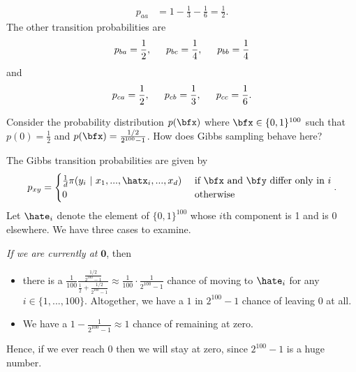 \begin{homework}[e]
\begin{prf}
\begin{align*}
      p_{aa} &= 1 - \frac{1}{3} - \frac{1}{6} = \frac{1}{2}.
    \end{align*}
    The other transition probabilities are
    \begin{align*}
      p_{ba} = \frac{1}{2}, \hspace{1.5em} p_{bc} = \frac{1}{4}, \hspace{1.5em} p_{bb} = \frac{1}{4}
    \end{align*}
    and
    \begin{align*}
      p_{ca} = \frac{1}{2}, \hspace{1.5em} p_{cb} = \frac{1}{3}, \hspace{1.5em} p_{cc} = \frac{1}{6}.
    \end{align*}
  \end{prf}
  \prob Consider the probability distribution $p(\bfx)$ where $\bfx \in \{0,1\}^{100}$ such that $p(0) = \frac{1}{2}$ and $p(\bfx) = \frac{1/2}{2^{100}-1}$. How does Gibbs sampling behave here?
  \begin{prf}
    The Gibbs transition probabilities are given by
    \begin{align*}
      p_{xy} =
      \begin{cases}
        \frac{1}{d}\pi(y_i ~|~ x_1,...,\hatx_i,...,x_d) & \text{ if $\bfx$ and $\bfy$ differ only in $i$} \\
        0 & \text{ otherwise }
      \end{cases}.
    \end{align*}
    Let $\hate_i$ denote the element of $\{0,1\}^{100}$ whose $i$th component is 1 and is 0 elsewhere.
    We have three cases to examine.

    \bigskip 

    \noindent\emph{If we are currently at }$\mathbf{0}$, then
    \begin{itemize}
    \item there is a $\frac{1}{100}\frac{\frac{1/2}{2^{100}-1}}{\frac{1}{2}+\frac{1/2}{2^{100}-1}} \approx \frac{1}{100}\cdot \frac{1}{2^{100}-1}$ chance of moving to $\hate_i$ for any $i \in \{1,...,100\}$. Altogether, we have a $1$ in $2^{100} - 1$ chance of leaving $0$ at all.
    \item We have a $1 - \frac{1}{2^{100}-1}\approx 1$ chance of remaining at zero.
    \end{itemize}
    Hence, if we ever reach 0 then we will stay at zero, since $2^{100}-1$ is a huge number.

    \bigskip


\end{prf}
\end{homework}
